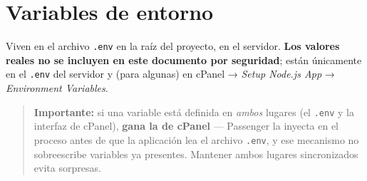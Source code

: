 \documentclass[11pt,a4paper]{article}
\begin{document}
\section{Variables de entorno}
\label{sec:env}

Viven en el archivo \texttt{.env} en la raíz del proyecto, en el servidor. \textbf{Los valores reales no se incluyen en este documento por seguridad}; están únicamente en el \texttt{.env} del servidor y (para algunas) en cPanel → \emph{Setup Node.js App} → \emph{Environment Variables}.

\begin{quote}
\textbf{Importante:} si una variable está definida en \emph{ambos} lugares (el \texttt{.env} y la interfaz de cPanel), \textbf{gana la de cPanel} — Passenger la inyecta en el proceso antes de que la aplicación lea el archivo \texttt{.env}, y ese mecanismo no sobreescribe variables ya presentes. Mantener ambos lugares sincronizados evita sorpresas.
\end{quote}
\end{document}
